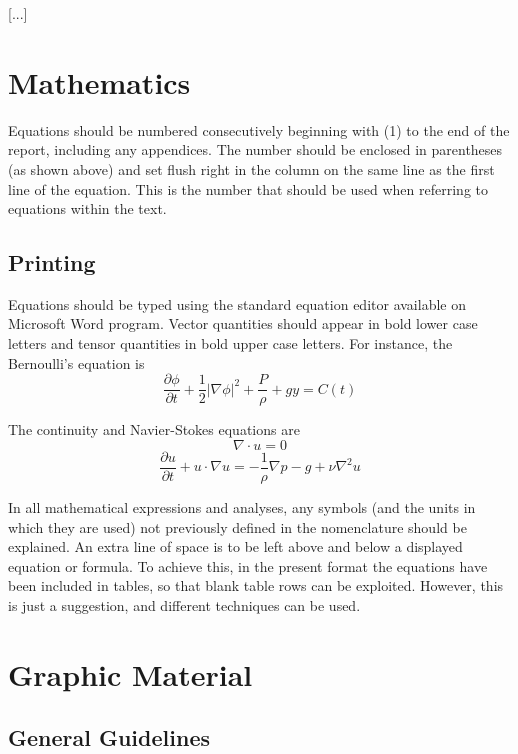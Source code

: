 \documentclass{stabs2021}
\begin{document}
[...]

\section{Mathematics}

Equations should be numbered consecutively beginning with (1) to the
end of the report, including any appendices. The number should be
enclosed in parentheses (as shown above) and set flush right in the
column on the same line as the first line of the equation. This is the
number that should be used when referring to equations within the
text.

\subsection{Printing}

Equations should be typed using the standard equation editor
available on Microsoft Word program. Vector quantities should appear
in bold lower case letters and tensor quantities in bold upper case
letters. For instance, the Bernoulli’s equation is
\begin{equation}
  \frac{\partial\phi}{\partial t} + \frac12 |\nabla \phi|^2 + \frac P\rho + gy = C(t)
\end{equation}

The continuity and Navier-Stokes equations are
\begin{equation}
  \nabla\cdot u = 0
\end{equation}
\begin{equation}
  \frac{\partial u}{\partial t} + u\cdot \nabla u = -\frac1\rho \nabla p - g + \nu \nabla^2 u
\end{equation}

In all mathematical expressions and analyses, any symbols (and the
units in which they are used) not previously defined in the
nomenclature should be explained. An extra line of space is to be
left above and below a displayed equation or formula. To achieve this,
in the present format the equations have been included in tables, so
that blank table rows can be exploited. However, this is just a
suggestion, and different techniques can be used.

\section{Graphic Material}

\subsection{General Guidelines}
\end{document}
